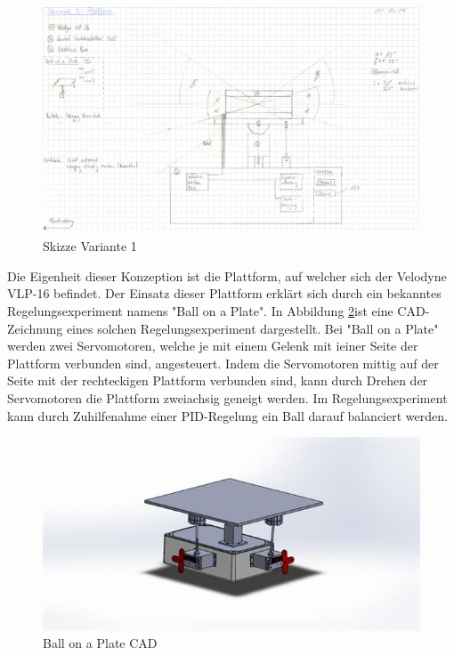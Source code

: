 \begin{figure}[H]
	\centering
	\includegraphics[width=1\textwidth]{resources/skizzev1.PNG}
	\caption{Skizze Variante 1}
\label{fig:plattform}
\end{figure} 
	
 Die Eigenheit dieser Konzeption ist die Plattform, auf welcher sich der Velodyne VLP-16 befindet. Der Einsatz dieser Plattform erklärt sich durch ein bekanntes Regelungsexperiment namens "Ball on a Plate". In Abbildung \ref{fig:BalllonaPlateCAD}ist eine CAD-Zeichnung eines solchen Regelungsexperiment dargestellt. Bei "Ball on a Plate" werden zwei Servomotoren, welche je mit einem Gelenk mit ieiner Seite der Plattform verbunden sind, angesteuert. Indem die Servomotoren mittig auf der Seite mit der rechteckigen Plattform verbunden sind, kann durch Drehen der Servomotoren die Plattform zweiachsig geneigt werden. Im Regelungsexperiment kann durch Zuhilfenahme einer PID-Regelung ein Ball darauf balanciert werden. 
 
\begin{figure}[H]
	\centering
 	\includegraphics[width=1\textwidth]{resources/ballonaplate_cad}
	\caption{Ball on a Plate CAD {\cite{ballonaplate}}}
	\label{fig:BalllonaPlateCAD}
\end{figure} 

